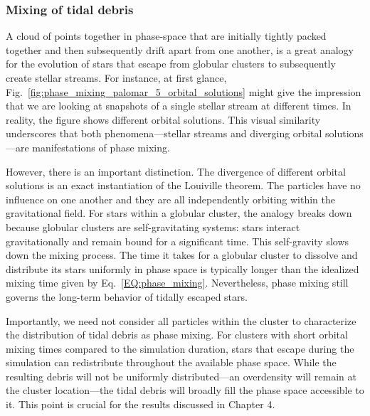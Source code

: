         \subsubsection{Mixing of tidal debris}
            A cloud of points together in phase-space that are initially tightly packed together and then subsequently drift apart from one another, is a great analogy for the evolution of stars that escape from globular clusters to subsequently create stellar streams. For instance, at first glance, Fig.~\ref{fig:phase_mixing_palomar_5_orbital_solutions} might give the impression that we are looking at snapshots of a single stellar stream at different times. In reality, the figure shows different orbital solutions. This visual similarity underscores that both phenomena—stellar streams and diverging orbital solutions—are manifestations of phase mixing. 
            
            However, there is an important distinction. The divergence of different orbital solutions is an exact instantiation of the Louiville theorem. The particles have no influence on one another and they are all independently orbiting within the gravitational field. For stars within a globular cluster, the analogy breaks down because globular clusters are self-gravitating systems: stars interact gravitationally and remain bound for a significant time. This self-gravity slows down the mixing process. The time it takes for a globular cluster to dissolve and distribute its stars uniformly in phase space is typically longer than the idealized mixing time given by Eq.~\ref{EQ:phase_mixing}. Nevertheless, phase mixing still governs the long-term behavior of tidally escaped stars.

            Importantly, we need not consider all particles within the cluster to characterize the distribution of tidal debris as phase mixing. For clusters with short orbital mixing times compared to the simulation duration, stars that escape during the simulation can redistribute throughout the available phase space. While the resulting debris will not be uniformly distributed—an overdensity will remain at the cluster location—the tidal debris will broadly fill the phase space accessible to it. This point is crucial for the results discussed in Chapter 4.

